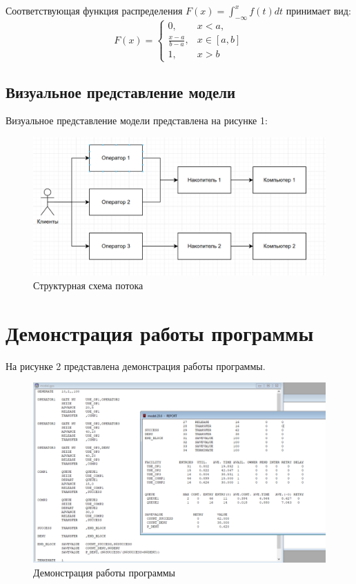 Соответствующая функция распределения $F(x) = \int_{-\infty}^{x}f(t)dt$ принимает вид: 
\begin{equation}
	F(x)=\begin{cases}
		0, & x < a, \\
		\frac{x - a}{b - a}, & x \in [a, b] \\
		1, & x > b
	\end{cases}
\end{equation}

\subsection{Визуальное представление модели}
Визуальное представление модели представлена на рисунке 1:

\captionsetup{justification=centering}
\begin{figure}[h]
	\begin{center}
		\includegraphics[width=0.7\linewidth]{inc/flow.png}
	\end{center}
	\caption{Структурная схема потока}
\end{figure}

\section{Демонстрация работы программы}

На рисунке 2 представлена демонстрация работы программы.

\begin{figure}[h]
	\centering
	\includegraphics[width=0.9\linewidth]{inc/demo}
	\caption{Демонстрация работы программы}
	\label{fig:demo}
\end{figure}


